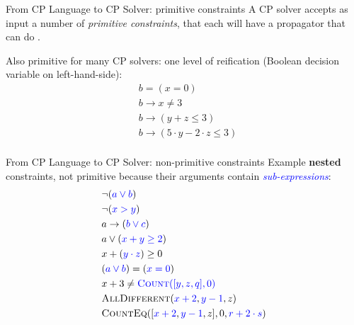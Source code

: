 \documentclass{cons-beamer}
\begin{document}
\begin{frame}{From CP Language to CP Solver: primitive constraints}
	A CP solver accepts as input a number of \textit{primitive constraints}, that each will have a propagator that can do .
	\vfill
	
	Also primitive for many CP solvers: one level of reification (Boolean decision variable on left-hand-side):
	\begin{align*}
		&b = (x = 0) \\
		&b \rightarrow x \neq 3 \\
		&b \rightarrow (y + z \leq 3) \\
		&b \rightarrow (5\cdot y - 2\cdot z \leq 3) \\
	\end{align*}
	
\end{frame}

\begin{frame}{From CP Language to CP Solver: non-primitive constraints}
	Example \textbf{nested} constraints, not primitive because their arguments contain \textit{\textcolor{blue}{sub-expressions}}:
	\begin{align*}
		& \neg (\textcolor{blue}{a \lor b}) \\
		& \neg (\textcolor{blue}{x > y}) \\
		& a \rightarrow (\textcolor{blue}{b \lor c})\\
		& a \lor (\textcolor{blue}{x + y \geq 2}) \\
		& x + (\textcolor{blue}{y \cdot z}) \geq 0 \\
		& (\textcolor{blue}{a \lor b}) = (\textcolor{blue}{x = 0}) \\
		& x + 3\neq \textcolor{blue}{\textsc{Count}([y,z,q], 0)} \\
		&\textsc{AllDifferent}(\textcolor{blue}{x+2},\textcolor{blue}{y-1},z) \\
		&\textsc{CountEq}([\textcolor{blue}{x+2},\textcolor{blue}{y-1},z], 0, \textcolor{blue}{r+2\cdot s}) \\
	\end{align*}
\end{frame}
\end{document}
